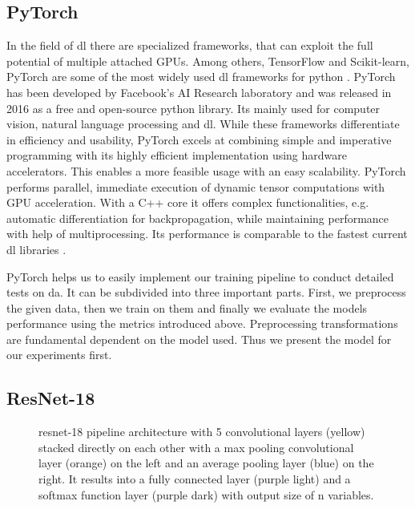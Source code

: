 \subsection{PyTorch}

In the field of \acrshort{dl} there are specialized frameworks, that can exploit the full potential of multiple attached GPUs. Among others, TensorFlow and Scikit-learn, PyTorch are some of the most widely used \acrshort{dl} frameworks for python \cite{Paszke.2019, Pedregosa.2011, Douglass.2020}. PyTorch has been developed by Facebook’s AI Research laboratory and was released in 2016 as a free and open-source python library. Its mainly used for computer vision, natural language processing and \acrshort{dl}. While these frameworks differentiate in efficiency and usability, PyTorch excels at combining simple and imperative programming with its highly efficient implementation using hardware accelerators. This enables a more feasible usage with an easy scalability. PyTorch performs parallel, immediate execution of dynamic tensor computations with GPU acceleration. With a C++ core it offers complex functionalities, e.g. automatic differentiation for backpropagation, while maintaining performance with help of multiprocessing. Its performance is comparable to the fastest current \acrshort{dl} libraries \cite{Paszke.2019}.

PyTorch helps us to easily implement our training pipeline to conduct detailed tests on \acrshort{da}. It can be subdivided into three important parts. First, we preprocess the given data, then we train on them and finally we evaluate the models performance using the metrics introduced above. Preprocessing transformations are fundamental dependent on the model used. Thus we present the model for our experiments first.

\subsection{ResNet-18}

\begin{figure}[hbt]
    
    \caption[\acrshort{resnet}-18]{\acrshort{resnet}-18 pipeline architecture with 5 convolutional layers (yellow) stacked directly on each other with a max pooling convolutional layer (orange) on the left and an average pooling layer (blue) on the right. It results into a fully connected layer (purple light) and a softmax function layer (purple dark) with output size of n variables. \cite{Iqbal.2020}}
    \label{fig:resnet18}
\end{figure}


